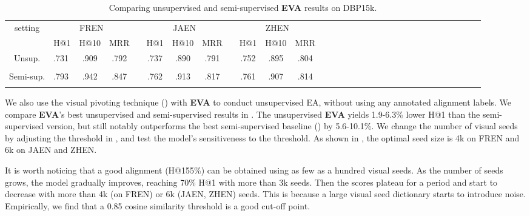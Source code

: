 \documentclass[letterpaper]{article} \usepackage{aaai21}  \usepackage{times}  \usepackage{helvet} \usepackage{courier}  \usepackage[hyphens]{url}  \usepackage{graphicx} \urlstyle{rm} \def\UrlFont{\rm}  \usepackage{natbib}  \usepackage{caption} \frenchspacing  \setlength{\pdfpagewidth}{8.5in}  \setlength{\pdfpageheight}{11in}
\newcommand{\modelname}[0]{\textbf{\textsc{EVA}}\xspace}
\newcommand{\stitle}[1]{\vspace{0.3ex} \noindent{\bf #1}}
\begin{document}
\begin{table}[!t]
\small
\setlength{\tabcolsep}{0.8pt}
\renewcommand{\arraystretch}{0.9}
\caption{\small{Comparing unsupervised and semi-supervised \modelname results on DBP15k.}}
\label{tab:unsupervised_dbp15k}
\centering
\begin{tabular}{clccccccccccccccccccccccccccccc}
\toprule
 \multirow{2}{*}{setting}  &  \multicolumn{3}{c}{FREN} &  & \multicolumn{3}{c}{JAEN} &  &  \multicolumn{3}{c}{ZHEN} \\
 \cmidrule{2-4}\cmidrule{6-8} \cmidrule{10-12}
   &  {\scriptsize H@1} &\scriptsize H@10 &\scriptsize MRR & &\scriptsize H@1 &\scriptsize H@10 &\scriptsize MRR & &\scriptsize H@1 &\scriptsize H@10 &\scriptsize MRR \\
  \midrule
  \multirow{2}{*}{\scriptsize Unsup.}  & .731 & .909 & .792 & & .737 & .890 & .791 & & .752 & .895 & .804 \\ 
 & \scriptsize  & \scriptsize  & \scriptsize   & & \scriptsize   & \scriptsize   & \scriptsize  &  & \scriptsize   & \scriptsize   & \scriptsize  \\
\midrule
 \multirow{2}{*}{\scriptsize Semi-sup.}  & .793 & .942 & .847 & & .762 & .913 & .817   & & .761 & .907 & .814  \\
 & \scriptsize  & \scriptsize  & \scriptsize   & & \scriptsize   & \scriptsize   & \scriptsize  &  & \scriptsize   & \scriptsize   & \scriptsize  \\
\bottomrule
\end{tabular}
\end{table}


\stitle{Unsupervised EA.}\label{sec:exp_unsup}
We also use the visual pivoting technique () with \modelname to conduct unsupervised EA, without using any annotated alignment labels. 
We compare \modelname's best unsupervised and semi-supervised results in . 
The unsupervised \modelname yields 1.9-6.3\% lower H@1 than the semi-supervised version,
but still notably outperforms the best semi-supervised baseline () by 5.6-10.1\%.  We change the number of visual seeds by adjusting the threshold  in , and test the model's sensitiveness to the threshold. As shown in ,
the optimal seed size is 4k on FREN and 6k on JAEN and ZHEN. 

It is worth noticing that a good alignment (H@155\%) can be obtained using as few as a hundred visual seeds. As the number of seeds grows, the model gradually improves, reaching 70\% H@1 with more than 3k seeds. Then the scores plateau for a period and start to decrease with more than 4k (on FREN) or 6k (JAEN, ZHEN) seeds. This is because a large visual seed dictionary starts to introduce noise.
Empirically, we find that a 0.85 cosine similarity threshold is a good cut-off point.
\end{document}
